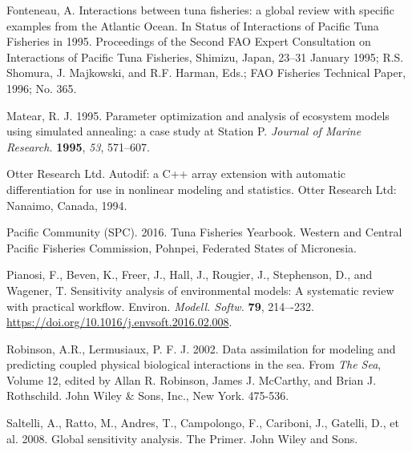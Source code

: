\begin{thebibliography}{999}
Fonteneau, A. Interactions between tuna fisheries: a global review with specific examples from the Atlantic Ocean. In Status of Interactions of Pacific Tuna Fisheries in 1995. Proceedings of the Second FAO Expert Consultation on Interactions of Pacific Tuna Fisheries, Shimizu, Japan, 23–31 January 1995; R.S. Shomura, J. Majkowski, and R.F. Harman, Eds.; FAO Fisheries Technical Paper, 1996; No. 365.


 Matear, R. J. 1995. Parameter optimization and analysis of ecosystem models using simulated annealing: a case study at Station P.  {\em Journal of Marine Research.} {\bf 1995}, {\em 53}, 571--607. 

Otter Research Ltd. Autodif: a C++ array extension with automatic differentiation for use in nonlinear modeling and statistics. Otter Research Ltd: Nanaimo, Canada, 1994.

 Pacific Community (SPC). 2016. Tuna Fisheries Yearbook. Western and Central Pacific Fisheries Commission, Pohnpei, Federated States of Micronesia.

Pianosi, F., Beven, K., Freer, J., Hall, J., Rougier, J., Stephenson, D., and Wagener, T. Sensitivity analysis of environmental models: A systematic review with practical workflow. Environ. {\em Modell. Softw.} {\bf 79}, 214–-232. \url{https://doi.org/10.1016/j.envsoft.2016.02.008}.


 Robinson, A.R., Lermusiaux, P. F. J. 2002. Data assimilation for modeling and predicting coupled physical biological interactions in the sea. From \textit {The Sea}, Volume 12, edited by Allan R. Robinson, James J. McCarthy, and Brian J. Rothschild. John Wiley \& Sons, Inc., New York. 475-536.

 Saltelli, A., Ratto, M., Andres, T., Campolongo, F., Cariboni, J., Gatelli, D., et al. 2008. Global sensitivity analysis. The Primer. John Wiley and Sons.


\end{thebibliography}
